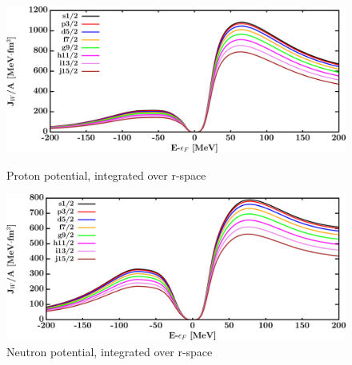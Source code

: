 \begin{figure}[H]
    \centering
    \begin{minipage}{0.45\textwidth}
        \centering
        \includegraphics[width=1.0\textwidth]{figures/sn124_protonVolumeIntegrals.png}
        \caption{Proton potential, integrated over r-space}
        \label{DOMFitData_sn124_proton_potentialIntegral}
    \end{minipage}\hfill
    \begin{minipage}{0.45\textwidth}
        \centering
        \includegraphics[width=1.0\textwidth]{figures/sn124_neutronVolumeIntegrals.png}
        \caption{Neutron potential, integrated over r-space}
        \label{DOMFitData_sn124_neutron_potentialIntegral}
    \end{minipage}
\end{figure}

\afterpage{\clearpage}

